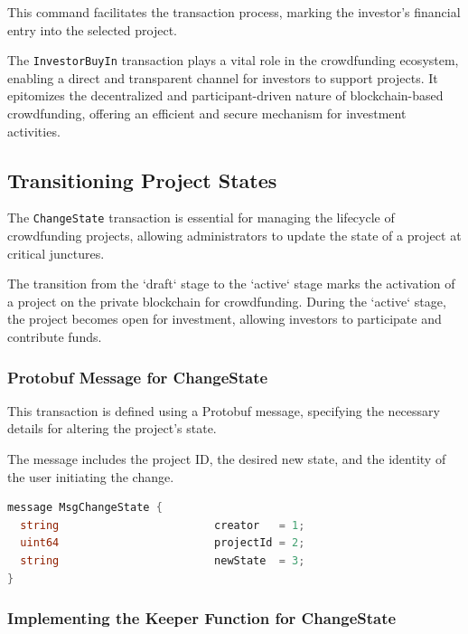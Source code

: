This command facilitates the transaction process, marking the investor's financial entry into the selected project.

The \texttt{InvestorBuyIn} transaction plays a vital role in the crowdfunding ecosystem, enabling a direct and transparent channel for investors to support projects. It epitomizes the decentralized and participant-driven nature of blockchain-based crowdfunding, offering an efficient and secure mechanism for investment activities.

\subsection{Transitioning Project States}
\label{subsec:transitioning-project-states}

The \texttt{ChangeState} transaction is essential for managing the lifecycle of crowdfunding projects, allowing administrators to update the state of a project at critical junctures.

The transition from the `draft` stage to the `active` stage marks the activation of a project on the private blockchain for crowdfunding. During the `active` stage, the project becomes open for investment, allowing investors to participate and contribute funds.

\subsubsection{Protobuf Message for ChangeState}
\label{subsubsec:protobuf-change-state}

This transaction is defined using a Protobuf message, specifying the necessary details for altering the project's state.

The message includes the project ID, the desired new state, and the identity of the user initiating the change.

\begin{lstlisting}[language=go, caption=ChangeState protobuf definition, label={lst:change_state_proto_implementation}]
message MsgChangeState {
  string                        creator   = 1;
  uint64                        projectId = 2;
  string                        newState  = 3;
}
\end{lstlisting}

\subsubsection{Implementing the Keeper Function for ChangeState}
\label{subsubsec:keeper-change-state}

